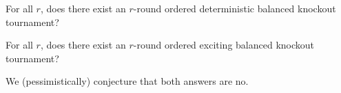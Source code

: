 {    \begin{oq}{}{}
        For all $r$, does there exist an $r$-round ordered deterministic balanced knockout tournament?
    \end{oq}

    \begin{oq}{}{}
        For all $r$, does there exist an $r$-round ordered exciting balanced knockout tournament?
    \end{oq}

    We (pessimistically) conjecture that both answers are no.
    }
